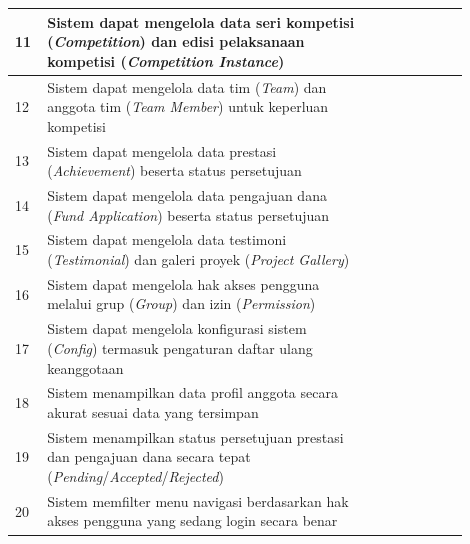 \begin{longtable}{|p{0.05\linewidth}|p{0.65\linewidth}|p{0.1\linewidth}|p{0.1\linewidth}|}
      \hline
      11          & Sistem dapat mengelola data seri kompetisi (\textit{Competition}) dan edisi pelaksanaan kompetisi (\textit{Competition Instance})     &                                         &                \\
      \hline
      12          & Sistem dapat mengelola data tim (\textit{Team}) dan anggota tim (\textit{Team Member}) untuk keperluan kompetisi                      &                                         &                \\
      \hline
      13          & Sistem dapat mengelola data prestasi (\textit{Achievement}) beserta status persetujuan                                                &                                         &                \\
      \hline
      14          & Sistem dapat mengelola data pengajuan dana (\textit{Fund Application}) beserta status persetujuan                                     &                                         &                \\
      \hline
      15          & Sistem dapat mengelola data testimoni (\textit{Testimonial}) dan galeri proyek (\textit{Project Gallery})                             &                                         &                \\
      \hline
      16          & Sistem dapat mengelola hak akses pengguna melalui grup (\textit{Group}) dan izin (\textit{Permission})                                &                                         &                \\
      \hline
      17          & Sistem dapat mengelola konfigurasi sistem (\textit{Config}) termasuk pengaturan daftar ulang keanggotaan                              &                                         &                \\
      \hline
      18          & Sistem menampilkan data profil anggota secara akurat sesuai data yang tersimpan                                                       &                                         &                \\
      \hline
      19          & Sistem menampilkan status persetujuan prestasi dan pengajuan dana secara tepat (\textit{Pending}/\textit{Accepted}/\textit{Rejected}) &                                         &                \\
      \hline
      20          & Sistem memfilter menu navigasi berdasarkan hak akses pengguna yang sedang login secara benar                                          &                                         &                \\

\end{longtable}
